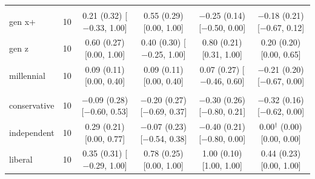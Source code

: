 \begin{table}[t]
\begin{tabular}{@{}lr*{4}{c}@{}}
\addlinespace
\multicolumn{6}{@{}l}{\textit{Age (D)}} \\
\quad gen x+ & 10 & \makecell{0.21 (0.32)\\ {[}$-$0.33, 1.00{]}} & \makecell{0.55 (0.29)\\ {[}0.00, 1.00{]}} & \makecell{$-$0.25 (0.14)\\ {[}$-$0.50, 0.00{]}} & \makecell{$-$0.18 (0.21)\\ {[}$-$0.67, 0.12{]}} \\
\quad gen z & 10 & \makecell{0.60 (0.27)\\ {[}0.00, 1.00{]}} & \makecell{0.40 (0.30)\\ {[}$-$0.25, 1.00{]}} & \makecell{0.80 (0.21)\\ {[}0.31, 1.00{]}} & \makecell{0.20 (0.20)\\ {[}0.00, 0.65{]}} \\
\quad millennial & 10 & \makecell{0.09 (0.11)\\ {[}0.00, 0.40{]}} & \makecell{0.09 (0.11)\\ {[}0.00, 0.40{]}} & \makecell{0.07 (0.27)\\ {[}$-$0.46, 0.60{]}} & \makecell{$-$0.21 (0.20)\\ {[}$-$0.67, 0.00{]}} \\
\addlinespace
\multicolumn{6}{@{}l}{\textit{Politics (N)}} \\
\quad conservative & 10 & \makecell{$-$0.09 (0.28)\\ {[}$-$0.60, 0.53{]}} & \makecell{$-$0.20 (0.27)\\ {[}$-$0.69, 0.37{]}} & \makecell{$-$0.30 (0.26)\\ {[}$-$0.80, 0.21{]}} & \makecell{$-$0.32 (0.16)\\ {[}$-$0.62, 0.00{]}} \\
\quad independent & 10 & \makecell{0.29 (0.21)\\ {[}0.00, 0.77{]}} & \makecell{$-$0.07 (0.23)\\ {[}$-$0.54, 0.38{]}} & \makecell{$-$0.40 (0.21)\\ {[}$-$0.80, 0.00{]}} & \makecell{0.00$^\dagger$ (0.00)\\ {[}0.00, 0.00{]}} \\
\quad liberal & 10 & \makecell{0.35 (0.31)\\ {[}$-$0.29, 1.00{]}} & \makecell{0.78 (0.25)\\ {[}0.00, 1.00{]}} & \makecell{1.00 (0.10)\\ {[}1.00, 1.00{]}} & \makecell{0.44 (0.23)\\ {[}0.00, 1.00{]}} \\

\end{tabular}
\end{table}
